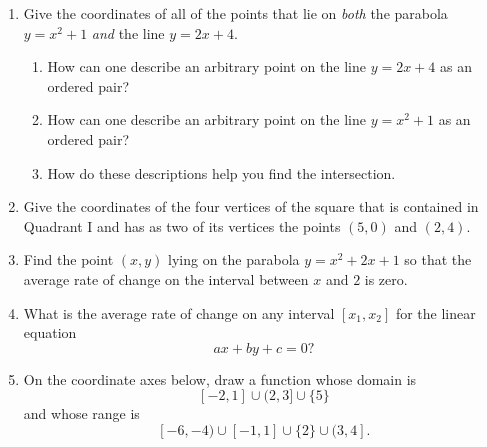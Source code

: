\documentclass[11pt]{article}
\begin{document}
\begin{enumerate}
\newpage

\item Give the coordinates of all of the points that lie on \emph{both} the parabola $y=x^2+1$ \emph{and} the line $y=2x+4$.
	\begin{enumerate}
		\item How can one describe an arbitrary point on the line $y=2x+4$ as an ordered pair?
		\item How can one describe an arbitrary point on the line $y=x^2+1$ as an ordered pair?
		\item How do these descriptions help you find the intersection.
	\end{enumerate}
	
\vspace{2in}		
		
\item Give the coordinates of the four vertices of the square that is contained in Quadrant I and has as two of its vertices the points $(5,0)$ and $(2,4)$.

\vspace{3in}

\item Find the point $(x,y)$ lying on the parabola $y = x^2 + 2x + 1$ so that the average rate of change on the interval between $x$ and $2$ is zero.

\newpage
\item What is the average rate of change on any interval $[x_1,x_2]$ for the linear equation
	$$ax+by+c = 0?$$

\vspace{2in}

\item On the coordinate axes below, draw a function whose domain is
	$$[-2,1]\cup(2,3]\cup\{5\}$$
	and whose range is
	$$[-6,-4)\cup[-1,1]\cup\{2\}\cup(3,4].$$

\begin{center}
\end{center}
\end{enumerate}
\end{document}
